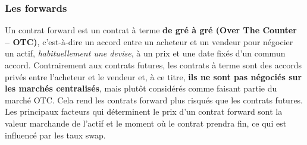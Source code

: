 \documentclass[a4paper]{article}
\begin{document}
\subsubsection{Les forwards}

Un contrat forward est un contrat à terme \textbf{de gré à gré (Over The Counter -- OTC)}, c’est-à-dire un accord entre un acheteur et un vendeur pour négocier un actif, \textit{habituellement une devise}, à un prix et une date fixés d’un commun accord. Contrairement aux contrats futures, les contrats à terme sont des accords privés entre l’acheteur et le vendeur et, à ce titre, \textbf{ils ne sont pas négociés sur les marchés centralisés}, mais plutôt considérés comme faisant partie du marché OTC. Cela rend les contrats forward plus risqués que les contrats futures. Les principaux facteurs qui déterminent le prix d’un contrat forward sont la valeur marchande de l’actif et le moment où le contrat prendra fin, ce qui est influencé par les taux swap.
\end{document}
